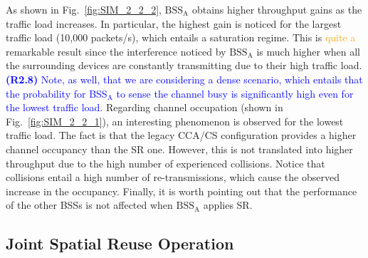 \documentclass{ieeeaccess}
\begin{document}
As shown in Fig.~\ref{fig:SIM_2_2_2}, $\text{BSS}_\text{A}$ obtains higher throughput gains as the traffic load increases. In particular, the highest gain is noticed for the largest traffic load (10,000 packets/s), which entails a saturation regime. This is \textcolor{orange}{quite a} remarkable result since the interference noticed by $\text{BSS}_\text{A}$ is much higher when all the surrounding devices are constantly transmitting due to their high traffic load. \textcolor{blue}{\textbf{(R2.8)} Note, as well, that we are considering a dense scenario, which entails that the probability for BSS$_\text{A}$ to sense the channel busy is significantly high even for the lowest traffic load.} Regarding channel occupation (shown in Fig.~\ref{fig:SIM_2_2_1}), an interesting phenomenon is observed for the lowest traffic load. The fact is that the legacy CCA/CS configuration provides a higher channel occupancy than the SR one. However, this is not translated into higher throughput due to the high number of experienced collisions. Notice that collisions entail a high number of re-transmissions, which cause the observed increase in the occupancy. Finally, it is worth pointing out that the performance of the other BSSs is not affected when $\text{BSS}_\text{A}$ applies SR.

\subsection{Joint Spatial Reuse Operation}
\label{section:random_scenarios_collaborative}
\end{document}
